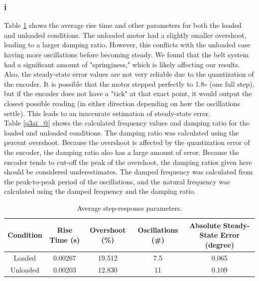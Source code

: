 \documentclass{article}
\theoremstyle{plain}
\theoremstyle{definition}
\theoremstyle{remark}
\begin{document}
\subsubsection*{i}
Table \ref{q3ai_!} shows the average rise time and other parameters for both the loaded and unloaded conditions. The unloaded motor had a slightly smaller overshoot, leading to a larger damping ratio. However, this conflicts with the unloaded case having more oscillations before becoming steady. We found that the belt system had a significant amount of "springiness," which is likely affecting our results. Also, the steady-state error values are not very reliable due to the quantization of the encoder. It is possible that the motor stepped perfectly to 1.8$\circ$ (one full step), but if the encoder does not have a "tick" at that exact point, it would output the closest possible reading (in either direction depending on how the oscillations settle). This leads to an inaccurate estimation of steady-state error. \\

Table \ref{q3ai_@} shows the calculated frequency values and damping ratio for the loaded and unloaded conditions. The damping ratio was calculated using the percent overshoot. Because the overshoot is affected by the quantization error of the encoder, the damping ratio also has a large amount of error. Because the encoder tends to cut-off the peak of the overshoot, the damping ratios given here should be considered underestimates. The damped frequency was calculated from the peak-to-peak period of the oscillations, and the natural frequency was calculated using the damped frequency and the damping ratio.\\


\begin{table}[htb]
\begin{center}
    \begin{tabular}{|c|c|c|c|c|}
        \hline
        Condition & Rise Time (s)  & Overshoot (\%) & Oscillations (\#) &  Absolute Steady-State Error (degree)   \\ \hline
        Loaded   & 0.00267    & 19.512 & 7.5 &   0.065 \\ 
        Unloaded   & 0.00203    & 12.830 & 11 & 0.109         \\         
        \hline
    \end{tabular}
\caption{Average step-response parameters.}
\label{q3ai_!}
\end{center}
\end{table}
\end{document}
